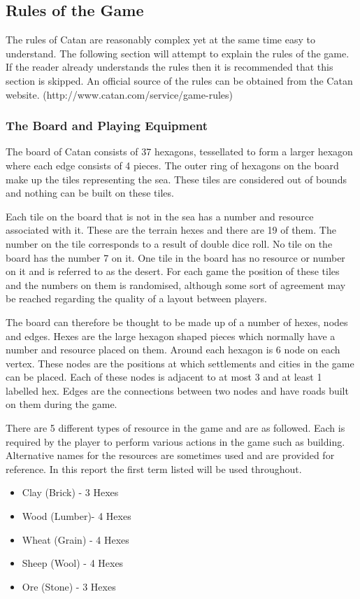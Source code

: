 \documentclass[]{article}
\begin{document}
\subsection{Rules of the Game}
The rules of Catan are reasonably complex yet at the same time easy to understand. The following section will attempt to explain the rules of the game. If the reader already understands the rules then it is recommended that this section is skipped. An official source of the rules can be obtained from the Catan website. (http://www.catan.com/service/game-rules)

\subsubsection{The Board and Playing Equipment}
The board of Catan consists of 37 hexagons, tessellated to form a larger hexagon where each edge consists of 4 pieces. The outer ring of hexagons on the board make up the tiles representing the sea. These tiles are considered out of bounds and nothing can be built on these tiles.

\par Each tile on the board that is not in the sea has a number and resource associated with it. These are the terrain hexes and there are 19 of them. The number on the tile corresponds to a result of double dice roll. No tile on the board has the number 7 on it. One tile in the board has no resource or number on it and is referred to as the desert. For each game the position of these tiles and the numbers on them is randomised, although some sort of agreement may be reached regarding the quality of a layout between players.

\par The board can therefore be thought to be made up of a number of hexes, nodes and edges. Hexes are the large hexagon shaped pieces which normally have a number and resource placed on them. Around each hexagon is 6 node on each vertex. These nodes are the positions at which settlements and cities in the game can be placed. Each of these nodes is adjacent to at most 3 and at least 1 labelled hex. Edges are the connections between two nodes and have roads built on them during the game.

\par There are 5 different types of resource in the game and are as followed. Each is required by the player to perform various actions in the game such as building. Alternative names for the resources are sometimes used and are provided for reference. In this report the first term listed will be used throughout.
\begin{itemize}
  \item Clay (Brick) - 3 Hexes
  \item Wood (Lumber)- 4 Hexes
  \item Wheat (Grain) - 4 Hexes
  \item Sheep (Wool) - 4 Hexes 
  \item Ore (Stone) - 3 Hexes
\end{itemize}
\end{document}
